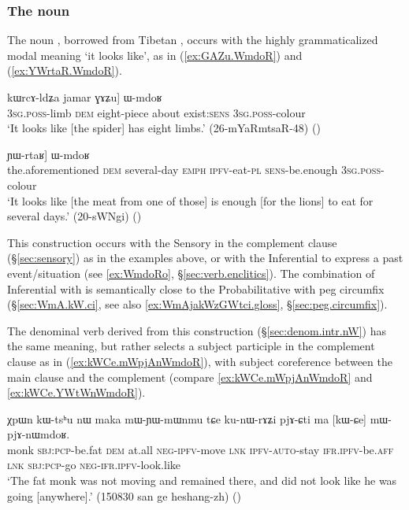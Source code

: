 \subsubsection{The noun  } \label{sec:WmdoR.TAME}
The noun , borrowed from Tibetan , occurs with the highly grammaticalized modal meaning `it looks like', as in (\ref{ex:GAZu.WmdoR}) and (\ref{ex:YWrtaR.WmdoR}).  


\begin{exe}
	\ex \label{ex:GAZu.WmdoR}
	\gll [ɯ-mɤlɤjaʁ nɯ, [...] kɯrcɤ-ldʑa jamar ɣɤʑu] ɯ-mdoʁ \\
	\textsc{3sg}.\textsc{poss}-limb \textsc{dem} { } eight-piece about exist:\textsc{sens} \textsc{3sg}.\textsc{poss}-colour \\
	\glt `It looks like [the spider] has eight limbs.' (26-mYaRmtsaR-48) ()
\end{exe}

\begin{exe}
	\ex \label{ex:YWrtaR.WmdoR}
	\gll    [iɕqʰa nɯ [kɤntɕʰɯ-sŋi ʑo tu-ndza-nɯ] ɲɯ-rtaʁ] ɯ-mdoʁ  \\
	the.aforementioned \textsc{dem} several-day \textsc{emph} \textsc{ipfv}-eat-\textsc{pl} \textsc{sens}-be.enough \textsc{3sg}.\textsc{poss}-colour \\
	\glt `It looks like [the meat from one of those] is enough [for the lions] to eat for several days.' (20-sWNgi)
()
\end{exe}

This construction occurs with the Sensory in the complement clause (§\ref{sec:sensory}) as in the examples above, or with the Inferential to express a past event/situation (see \ref{ex:WmdoRo}, §\ref{sec:verb.enclitics}). The combination of Inferential with  is semantically close to the Probabilitative with peg circumfix (§\ref{sec:WmA.kW.ci}, see also \ref{ex:WmAjakWzGWtci.gloss}, §\ref{sec:peg.circumfix}).

The denominal verb   derived from this construction (§\ref{sec:denom.intr.nW}) has the same meaning, but rather selects a subject participle in the complement clause as in (\ref{ex:kWCe.mWpjAnWmdoR}), with subject coreference between the main clause and the complement (compare \ref{ex:kWCe.mWpjAnWmdoR} and \ref{ex:kWCe.YWtWnWmdoR}).


\begin{exe}
	\ex \label{ex:kWCe.mWpjAnWmdoR}
	\gll  χpɯn kɯ-tsʰu nɯ maka mɯ-ɲɯ-mɯnmu tɕe ku-nɯ-rɤʑi pjɤ-ɕti ma [kɯ-ɕe] mɯ-pjɤ-nɯmdoʁ. \\
	monk \textsc{sbj}:\textsc{pcp}-be.fat \textsc{dem} at.all \textsc{neg}-\textsc{ipfv}-move \textsc{lnk} \textsc{ipfv}-\textsc{auto}-stay \textsc{ifr}.\textsc{ipfv}-be.\textsc{aff} \textsc{lnk} \textsc{sbj}:\textsc{pcp}-go \textsc{neg}-\textsc{ifr}.\textsc{ipfv}-look.like \\
	\glt `The fat monk was not moving and remained there, and did not look like he was going [anywhere].'  (150830 san ge heshang-zh)
()
\end{exe}

